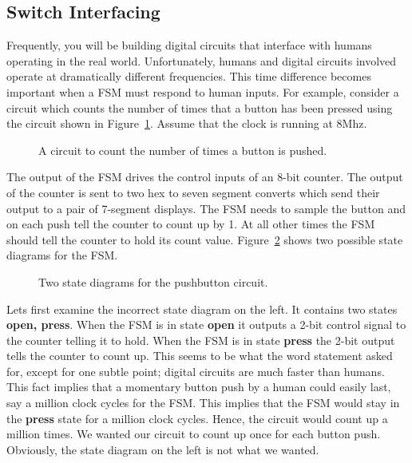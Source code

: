         \subsection{Switch Interfacing}
        \label{page:push_dp}
        Frequently, you will be building digital circuits that interface with
        humans operating in the real world.  Unfortunately, humans and digital
        circuits involved operate at dramatically different frequencies.
        This time difference becomes important when a FSM must respond to
        human inputs.  For example, consider a circuit which counts the number
        of times that a button has been pressed using the circuit shown in
        Figure~\ref{fig:commonPeripheralComponentspush7button}.  Assume that the clock is running at
        8Mhz.

        \begin{figure}[ht]
            \caption{A circuit to count the number of times a button is pushed.}
            \label{fig:commonPeripheralComponentspush7button}
        \end{figure}

        The output of the FSM drives the control inputs of an 8-bit counter.
        The output of the counter is sent to two hex to seven segment converts
        which send their output to a pair of 7-segment displays.
        The FSM needs to sample the button and on each push tell the counter
        to count up by 1.  At all other times the FSM should tell the counter
        to hold its count value.   Figure~\ref{fig:commonPeripheralComponentspushfsm}
        shows two possible state diagrams for the FSM.

        \begin{figure}[ht]
            \caption{Two state diagrams for the pushbutton circuit.}
            \label{fig:commonPeripheralComponentspushfsm}
        \end{figure}

        Lets first examine the incorrect state diagram on the left.  It
        contains two states \textbf{ open, press}.  When the FSM is in state
        \textbf{ open} it outputs a 2-bit control signal to the counter
        telling it to hold.  When the FSM is in state \textbf{ press} the
        2-bit output tells the counter to count up.  This seems to be
        what the word statement asked for, except for one subtle point; digital
        circuits are much faster than humans.  This fact implies that
        a momentary button push by a human could easily last, say
        a million clock cycles for the FSM.  This implies that the FSM
        would stay in the \textbf{ press} state for a million clock cycles.
        Hence, the circuit would count up a million times.  We wanted
        our circuit to count up once for each button push.  Obviously,
        the state diagram on the left is not what we wanted.

